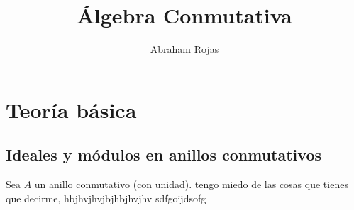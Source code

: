 \documentclass[12pt]{book}
\newtheorem{ex}{Ejercicio}
\begin{document}
\large
\title{Álgebra Conmutativa}	
	\author{Abraham Rojas}
	\date{ }
	
	\maketitle
	\tableofcontents

	

	
	
\part{Teoría básica}	
	
	
\chapter{Ideales y módulos en anillos conmutativos}

Sea $A$ un anillo conmutativo (con unidad). tengo miedo de las cosas que tienes que decirme, hbjhvjhvjbjhbjhvjhv sdfgoijdsofg\\
%
%
%
%
%
%
%
%
\end{document}
